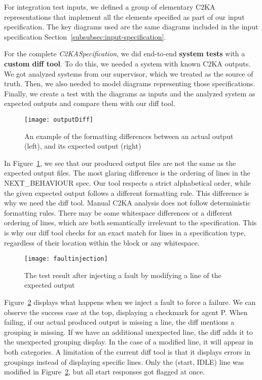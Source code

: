 For integration test inputs, we defined a group of elementary C2KA representations that implement
all the elements specified as part of our input specification.
The key diagrams used are the same diagrams included in the input specification Section~\ref{subsubsec:input-specification}.

For the complete \textit{C2KASpecification}, we did end-to-end \textbf{system tests} with a \textbf{custom diff tool}.
To do this, we needed a system with known C2KA outputs.
We got analyzed systems from our supervisor, which we treated as the source of truth.
Then, we also needed to model diagrams representing those specifications.
Finally, we create a test with the diagrams as inputs and the analyzed system as expected outputs and compare them with our diff tool.

\begin{figure}[h]
    \centering
    \texttt{[image: outputDiff]}
    \caption{An example of the formatting differences between an actual output (left), and its expected output (right)}
    \label{fig:out-diff}
\end{figure}
In Figure~\ref{fig:out-diff}, we see that our produced output files are not the same as the expected output files.
The most glaring difference is the ordering of lines in the NEXT\_BEHAVIOUR spec.
Our tool respects a strict alphabetical order, while the given expected output follows a different formatting rule.
This difference is why we need the diff tool.
Manual C2KA analysis does not follow deterministic formatting rules.
There may be some whitespace differences or a different ordering of lines, which are both semantically irrelevant to the specification.
This is why our diff tool checks for an exact match for lines in a specification type,
regardless of their location within the block or any whitespace.

\begin{figure}
    \centering
    \texttt{[image: faultinjection]}
    \caption{The test result after injecting a fault by modifying a line of the expected output}
    \label{fig:faultinjection}
\end{figure}
Figure~\ref{fig:faultinjection} displays what happens when we inject a fault to force a failure.
We can observe the success case at the top, displaying a checkmark for agent P\@.
When failing, if our actual produced output is missing a line, the diff mentions a grouping is missing.
If we have an additional unexpected line, the diff adds it to the unexpected grouping display.
In the case of a modified line, it will appear in both categories.
A limitation of the current diff tool is that it displays errors in groupings instead of displaying specific lines.
Only the (start, IDLE) line was modified in Figure~\ref{fig:faultinjection}, but all start responses got flagged at once.

